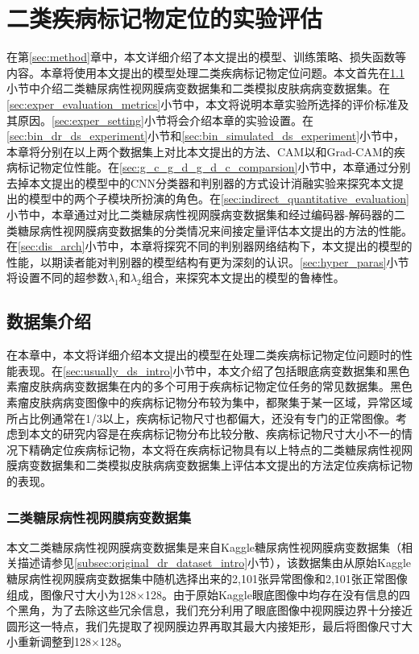 \chapter{二类疾病标记物定位的实验评估}\label{sec:experiments}
在第\ref{sec:method}章中，本文详细介绍了本文提出的模型、训练策略、损失函数等内容。本章将使用本文提出的模型处理二类疾病标记物定位问题。本文首先在\ref{sec:exper_ds_intro}小节中介绍二类糖尿病性视网膜病变数据集和二类模拟皮肤病病变数据集。在\ref{sec:exper_evaluation_metrics}小节中，本文将说明本章实验所选择的评价标准及其原因。\ref{sec:exper_setting}小节将会介绍本章的实验设置。在\ref{sec:bin_dr_ds_experiment}小节和\ref{sec:bin_simulated_ds_experiment}小节中，本章将分别在以上两个数据集上对比本文提出的方法、CAM以和Grad-CAM的疾病标记物定位性能。在\ref{sec:g_c_g_d_g_d_c_comparsion}小节中，本章通过分别去掉本文提出的模型中的CNN分类器和判别器的方式设计消融实验来探究本文提出的模型中的两个子模块所扮演的角色。在\ref{sec:indirect_quantitative_evaluation}小节中，本章通过对比二类糖尿病性视网膜病变数据集和经过编码器-解码器的二类糖尿病性视网膜病变数据集的分类情况来间接定量评估本文提出的方法的性能。在\ref{sec:dis_arch}小节中，本章将探究不同的判别器网络结构下，本文提出的模型的性能，以期读者能对判别器的模型结构有更为深刻的认识。\ref{sec:hyper_paras}小节将设置不同的超参数$\lambda_{1}$和$\lambda_{2}$组合，来探究本文提出的模型的鲁棒性。
\section{数据集介绍}\label{sec:exper_ds_intro}
在本章中，本文将详细介绍本文提出的模型在处理二类疾病标记物定位问题时的性能表现。在\ref{sec:usually_ds_intro}小节中，本文介绍了包括眼底病变数据集和黑色素瘤皮肤病病变数据集在内的多个可用于疾病标记物定位任务的常见数据集。黑色素瘤皮肤病病变图像中的疾病标记物分布较为集中，都聚集于某一区域，异常区域所占比例通常在1/3以上，疾病标记物尺寸也都偏大，还没有专门的正常图像。考虑到本文的研究内容是在疾病标记物分布比较分散、疾病标记物尺寸大小不一的情况下精确定位疾病标记物，本文将在疾病标记物具有以上特点的二类糖尿病性视网膜病变数据集和二类模拟皮肤病病变数据集上评估本文提出的方法定位疾病标记物的表现。
\subsection{二类糖尿病性视网膜病变数据集}\label{subsec:bin_dr_ds}
本文二类糖尿病性视网膜病变数据集是来自Kaggle糖尿病性视网膜病变数据集（相关描述请参见\ref{subsec:original_dr_dataset_intro}小节），该数据集由从原始Kaggle糖尿病性视网膜病变数据集中随机选择出来的2,101张异常图像和2,101张正常图像组成，图像尺寸大小为128$\times$128。由于原始Kaggle眼底图像中均存在没有信息的四个黑角，为了去除这些冗余信息，我们充分利用了眼底图像中视网膜边界十分接近圆形这一特点，我们先提取了视网膜边界再取其最大内接矩形，最后将图像尺寸大小重新调整到128$\times$128。

